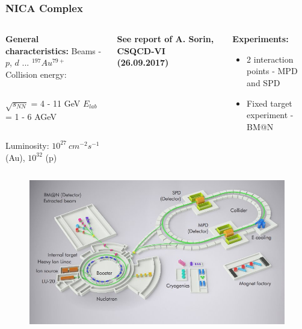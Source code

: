 \documentclass[dvipsnames] {beamer}
\begin{document}
\begin{frame}[shrink=40]
  \bf
  \frametitle{NICA Complex}
  \begin{columns}[c]
    \begin{block}{\centering \bf General characteristics:}
      \centering  Beams - {\color{red}$p$, $d$ ... $^{197}Au^{79+}$} \\
      \centering  Collision energy: 
      \begin{columns}[c]
        $\sqrt{s_{NN}}$ = {\color{red} 4 - 11} GeV
        $E_{lab}$ =  {\color{red}1 - 6} AGeV
      \end{columns}
      Luminosity: {\color{red}$10^{27}~cm^{-2}s^{-1}$} (Au), {\color{red}$10^{32}$} (p)

    \end{block}
    \begin{block}{}
      \bf
      \centering
       See report of A. Sorin, CSQCD-VI (26.09.2017) 
    \end{block}
    \begin{block}{\centering \bf Experiments:}
      \begin{itemize}
      \item 2 interaction points - {\color{red}MPD} and  {\color{red}SPD}
      \item Fixed target experiment -  {\color{red}BM@N}
      \end{itemize}
    \end{block}
  \end{columns}
  \begin{columns}[c]
    \begin{block}{}
      \begin{figure}[H]
        \includegraphics[width=1.\linewidth]{nica_complex1.png}

\end{figure}
\end{block}
\end{columns}
\end{frame}
\end{document}

